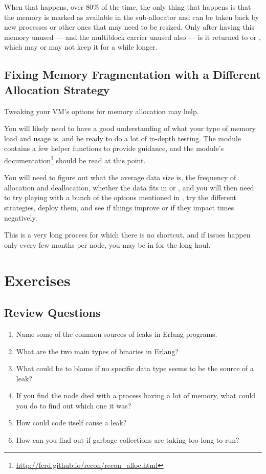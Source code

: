 \documentclass[11pt, oneside]{book}   	%
\begin{document}
When that happens, over 80\% of the time, the only thing that happens is that the memory is marked as available in the sub-allocator and can be taken back by new processes or other ones that may need to be resized. Only after having this memory unused — and the multiblock carrier unused also — is it returned to  or , which may or may not keep it for a while longer.

\subsection{Fixing Memory Fragmentation with a Different Allocation Strategy}

Tweaking your VM's options for memory allocation may help.

You will likely need to have a good understanding of what your type of memory load and usage is, and be ready to do a lot of in-depth testing. The  module contains a few helper functions to provide guidance, and the module's documentation\footnote{\href{http://ferd.github.io/recon/recon\_alloc.html}{http://ferd.github.io/recon/recon\_alloc.html}} should be read at this point.

You will need to figure out what the average data size is, the frequency of allocation and deallocation, whether the data fits in  or ,  and you will then need to try playing with a bunch of the options mentioned in , try the different strategies, deploy them, and see if things improve or if they impact times negatively.

This is a very long process for which there is no shortcut, and if issues happen only every few months per node, you may be in for the long haul. 


\section{Exercises}

\subsection*{Review Questions}

\begin{enumerate}
	\item Name some of the common sources of leaks in Erlang programs.
	\item What are the two main types of binaries in Erlang?
	\item What could be to blame if no specific data type seems to be the source of a leak?
	\item If you find the node died with a process having a lot of memory, what could you do to find out which one it was?
	\item How could code itself cause a leak?
	\item How can you find out if garbage collections are taking too long to run?
\end{enumerate}
\end{document}
